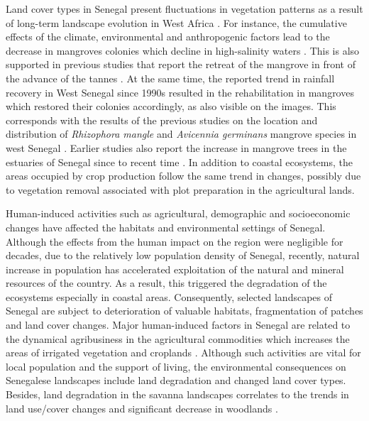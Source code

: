 \documentclass[earth,article,submit,pdftex,moreauthors]{Definitions/mdpi}
\begin{document}
{Land} cover types in Senegal {present } fluctuations in vegetation patterns as a result of long-term landscape evolution in West Africa \cite{Furian,033139ar,LOUM2014100,BRINK2009501}. {For instance, }the cumulative effects of the climate, environmental and anthropogenic factors {lead to the decrease in} mangroves colonies which decline in high-salinity waters \cite{dieye2013dynamique}. This is also supported in {previous studies that} report the retreat of the mangrove in front of the advance of the tannes \cite{Lebigre}. At the same time, the {reported }trend in rainfall recovery in West Senegal since 1990s \cite{andrieu2020botanical} resulted in the rehabilitation in mangroves which restored their colonies accordingly, {as also }visible on the images. This corresponds with the results of the previous studies on the location and distribution of \emph{Rhizophora mangle} and \emph{Avicennia germinans} mangrove species in west Senegal \cite{Diaw,rs13101961}. Earlier studies also report the increase in mangrove trees in the estuaries of Senegal since to recent time \cite{FENT2019214}. {In addition to coastal ecosystems, the areas occupied by crop production follow the same trend in changes, possibly due to vegetation removal associated with plot preparation in the agricultural lands.}

{Human-induced activities such as agricultural, demographic and socioeconomic changes have affected the habitats and environmental settings of Senegal. Although the effects from the human impact on the region were negligible for decades, due to the relatively low population density of Senegal, recently, natural increase in population has accelerated exploitation of the natural and mineral resources of the country. As a result, this triggered the degradation of the ecosystems especially in coastal areas. Consequently, selected landscapes of Senegal are subject to deterioration of valuable habitats, fragmentation of patches and land cover changes.} Major human-induced {factors in Senegal are related to} the dynamical agribusiness in the agricultural commodities which {increases the }  areas of irrigated vegetation {and croplands} \cite{land8030042}. {Although such }activities are vital for local population and the support of living{, }the environmental consequences on Senegalese landscapes include land degradation and changed land cover types. Besides, land degradation{ }in the savanna landscapes { }correlates to the trends in land use/cover changes and significant decrease in woodlands \cite{Kalema}.
\end{document}
